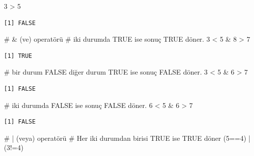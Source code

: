 \documentclass[
  letterpaper,
  DIV=11,
  numbers=noendperiod]{scrreprt}
\newenvironment{Shaded}{\begin{snugshade}}{\end{snugshade}}
\newcommand{\CommentTok}[1]{\textcolor[rgb]{0.37,0.37,0.37}{#1}}
\newcommand{\DecValTok}[1]{\textcolor[rgb]{0.68,0.00,0.00}{#1}}
\newcommand{\NormalTok}[1]{\textcolor[rgb]{0.00,0.23,0.31}{#1}}
\newcommand{\SpecialCharTok}[1]{\textcolor[rgb]{0.37,0.37,0.37}{#1}}
\begin{document}
\begin{Shaded}
\begin{Highlighting}[]
\DecValTok{3} \SpecialCharTok{\textgreater{}} \DecValTok{5}
\end{Highlighting}
\end{Shaded}

\begin{verbatim}
[1] FALSE
\end{verbatim}

\begin{Shaded}
\begin{Highlighting}[]
\CommentTok{\# \& (ve) operatörü}
\CommentTok{\# iki durumda TRUE ise sonuç TRUE döner.}
\DecValTok{3} \SpecialCharTok{\textless{}} \DecValTok{5} \SpecialCharTok{\&} \DecValTok{8} \SpecialCharTok{\textgreater{}} \DecValTok{7}
\end{Highlighting}
\end{Shaded}

\begin{verbatim}
[1] TRUE
\end{verbatim}

\begin{Shaded}
\begin{Highlighting}[]
\CommentTok{\# bir durum FALSE diğer durum TRUE ise sonuç FALSE döner.}
\DecValTok{3} \SpecialCharTok{\textless{}} \DecValTok{5} \SpecialCharTok{\&} \DecValTok{6} \SpecialCharTok{\textgreater{}} \DecValTok{7}
\end{Highlighting}
\end{Shaded}

\begin{verbatim}
[1] FALSE
\end{verbatim}

\begin{Shaded}
\begin{Highlighting}[]
\CommentTok{\# iki durumda FALSE ise sonuç FALSE döner.}
\DecValTok{6} \SpecialCharTok{\textless{}} \DecValTok{5} \SpecialCharTok{\&} \DecValTok{6} \SpecialCharTok{\textgreater{}} \DecValTok{7}
\end{Highlighting}
\end{Shaded}

\begin{verbatim}
[1] FALSE
\end{verbatim}

\begin{Shaded}
\begin{Highlighting}[]
\CommentTok{\# | (veya) operatörü}
\CommentTok{\# Her iki durumdan birisi TRUE ise TRUE döner}
\NormalTok{(}\DecValTok{5}\SpecialCharTok{==}\DecValTok{4}\NormalTok{) }\SpecialCharTok{|}\NormalTok{ (}\DecValTok{3}\SpecialCharTok{!=}\DecValTok{4}\NormalTok{)}
\end{Highlighting}
\end{Shaded}
\end{document}
